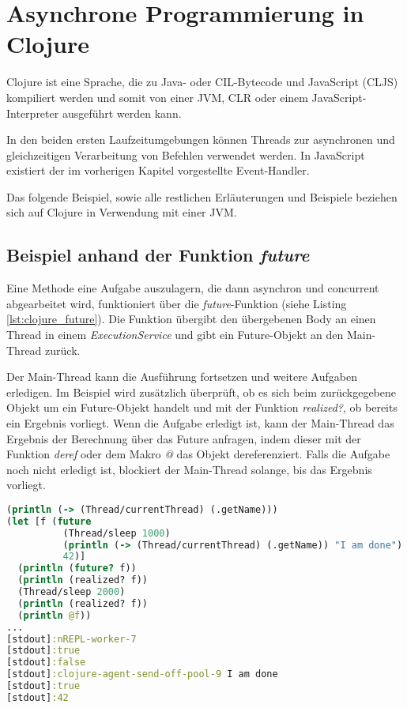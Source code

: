 \section{Asynchrone Programmierung in Clojure}

Clojure ist eine Sprache, die zu Java- oder CIL-Bytecode und JavaScript (\acl{CLJS}) kompiliert werden und somit von einer \ac{JVM}, \ac{CLR} oder einem JavaScript-Interpreter ausgeführt werden kann.

In den beiden ersten Laufzeitumgebungen können Threads zur asynchronen und gleichzeitigen Verarbeitung von Befehlen verwendet werden. In JavaScript existiert der im vorherigen Kapitel vorgestellte Event-Handler.

Das folgende Beispiel, sowie alle restlichen Erläuterungen und Beispiele beziehen sich auf Clojure in Verwendung mit einer \ac{JVM}.

\subsection*{Beispiel anhand der Funktion \textit{future}}
Eine Methode eine Aufgabe auszulagern, die dann asynchron und concurrent abgearbeitet wird, funktioniert über die \textit{future}-Funktion (siehe Listing \ref{lst:clojure_future}). Die Funktion übergibt den übergebenen Body an einen Thread in einem \textit{ExecutionService} und gibt ein Future-Objekt an den Main-Thread zurück.

Der Main-Thread kann die Ausführung fortsetzen und weitere Aufgaben erledigen. Im Beispiel wird zusätzlich überprüft, ob es sich beim zurückgegebene Objekt um ein Future-Objekt handelt und mit der Funktion  \textit{realized?}, ob bereits ein Ergebnis vorliegt. Wenn die Aufgabe erledigt ist, kann der Main-Thread das Ergebnis der Berechnung über das Future anfragen, indem dieser mit der Funktion \textit{deref} oder dem Makro \textit{@} das Objekt dereferenziert. Falls die Aufgabe noch nicht erledigt ist, blockiert der Main-Thread solange, bis das Ergebnis vorliegt.

\begin{lstlisting}[language=Clojure,caption=Das asynchrone Ausführen von Befehlen mit der Funktion \textit{future},label=lst:clojure_future]
(println (-> (Thread/currentThread) (.getName)))
(let [f (future
          (Thread/sleep 1000)
          (println (-> (Thread/currentThread) (.getName)) "I am done")
          42)]
  (println (future? f))
  (println (realized? f))
  (Thread/sleep 2000)
  (println (realized? f))
  (println @f))
...
[stdout]:nREPL-worker-7
[stdout]:true
[stdout]:false
[stdout]:clojure-agent-send-off-pool-9 I am done
[stdout]:true
[stdout]:42
\end{lstlisting}

